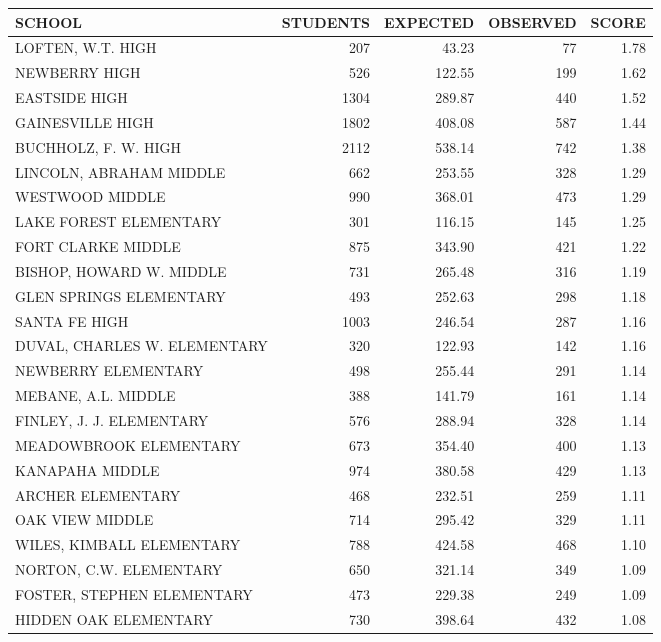 \documentclass{article}
\begin{document}
\begin{multicols}{2}
\begin{table}[H]
\begin{table}[ht]
\centering
{\tiny
\begin{tabular}{lrrrr}
  \hline
SCHOOL & STUDENTS & EXPECTED & OBSERVED & SCORE \\ 
  \hline
LOFTEN, W.T. HIGH  & 207 & 43.23 &  77 & 1.78 \\ 
  NEWBERRY HIGH  & 526 & 122.55 & 199 & 1.62 \\ 
  EASTSIDE HIGH  & 1304 & 289.87 & 440 & 1.52 \\ 
  GAINESVILLE HIGH  & 1802 & 408.08 & 587 & 1.44 \\ 
  BUCHHOLZ, F. W. HIGH  & 2112 & 538.14 & 742 & 1.38 \\ 
  LINCOLN, ABRAHAM MIDDLE  & 662 & 253.55 & 328 & 1.29 \\ 
  WESTWOOD MIDDLE  & 990 & 368.01 & 473 & 1.29 \\ 
  LAKE FOREST ELEMENTARY & 301 & 116.15 & 145 & 1.25 \\ 
  FORT CLARKE MIDDLE  & 875 & 343.90 & 421 & 1.22 \\ 
  BISHOP, HOWARD W. MIDDLE  & 731 & 265.48 & 316 & 1.19 \\ 
  GLEN SPRINGS ELEMENTARY & 493 & 252.63 & 298 & 1.18 \\ 
  SANTA FE HIGH  & 1003 & 246.54 & 287 & 1.16 \\ 
  DUVAL, CHARLES W. ELEMENTARY & 320 & 122.93 & 142 & 1.16 \\ 
  NEWBERRY ELEMENTARY & 498 & 255.44 & 291 & 1.14 \\ 
  MEBANE, A.L. MIDDLE  & 388 & 141.79 & 161 & 1.14 \\ 
  FINLEY, J. J. ELEMENTARY & 576 & 288.94 & 328 & 1.14 \\ 
  MEADOWBROOK ELEMENTARY  & 673 & 354.40 & 400 & 1.13 \\ 
  KANAPAHA MIDDLE  & 974 & 380.58 & 429 & 1.13 \\ 
  ARCHER ELEMENTARY  & 468 & 232.51 & 259 & 1.11 \\ 
  OAK VIEW MIDDLE  & 714 & 295.42 & 329 & 1.11 \\ 
  WILES, KIMBALL ELEMENTARY & 788 & 424.58 & 468 & 1.10 \\ 
  NORTON, C.W. ELEMENTARY & 650 & 321.14 & 349 & 1.09 \\ 
  FOSTER, STEPHEN ELEMENTARY & 473 & 229.38 & 249 & 1.09 \\ 
  HIDDEN OAK ELEMENTARY & 730 & 398.64 & 432 & 1.08 \\ 

\end{tabular}}
\end{table}
\end{table}
\end{multicols}
\end{document}
